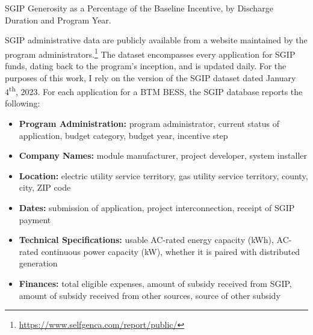 \documentclass[preprint,12pt,authoryear]{elsarticle}
\newcommand\Xth{\textsuperscript{th}}
\begin{document}


\begin{table}[t]
\centering

\caption{SGIP Generosity as a Percentage of the Baseline Incentive, by Discharge Duration and Program Year.}\label{tab:LD_penalties}
\end{table}

SGIP administrative data are publicly available from a website maintained by the program administrators.\footnote{\url{https://www.selfgenca.com/report/public/}} The dataset encompasses every application for SGIP funds, dating back to the program's inception, and is updated daily. For the purposes of this work, I rely on the version of the SGIP dataset dated January 4\Xth, 2023. For each application for a BTM BESS, the SGIP database reports the following:

\begin{itemize}
\item \textbf{Program Administration:} program administrator, current status of application, budget category, budget year, incentive step
\item \textbf{Company Names:} module manufacturer, project developer, system installer
\item \textbf{Location:} electric utility service territory, gas utility service territory, county, city, ZIP code
\item \textbf{Dates:} submission of application, project interconnection, receipt of SGIP payment
\item \textbf{Technical Specifications:} usable AC-rated energy capacity (kWh),  AC-rated continuous power capacity (kW), whether it is paired with distributed generation
\item \textbf{Finances:} total eligible expenses, amount of subsidy received from SGIP, amount of subsidy received from other sources, source of other subsidy
\end{itemize}
\end{document}
